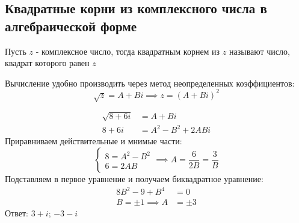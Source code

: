 \documentclass[12pt, a4paper]{article}
\begin{document}
    \subsection{Квадратные корни из комплексного числа в алгебраической форме}
    \begin{definition}
        Пусть \( z \) - комплексное число, тогда квадратным корнем из \( z \) называют число, квадрат которого равен \( z \)
    \end{definition}
    Вычисление удобно производить через метод неопределенных коэффициентов: \[
        \sqrt{z} = A + Bi \implies z = (A + Bi)^2
    \] 
    \begin{exmp}
        \begin{align*}
            \sqrt{8 + 6i}  &= A + Bi \\
            8 + 6i &= A^2 - B^2 + 2ABi
        \end{align*}
        Приравниваем действительные и мнимые части: \[
            \begin{cases}
                8 = A^2 - B^2 \\
                6 = 2AB
            \end{cases} \implies A = \frac{6}{2B} = \frac{3}{B}
        \] 
        Подставляем в первое уравнение и получаем биквадратное уравнение:
        \begin{align*}
            8B^2 - 9 + B^{4} &= 0 \\
            B = \pm 1 \implies A &= \pm 3
        \end{align*}
        Ответ: \( 3 + i \); \( -3 - i \)
    \end{exmp}
\end{document}
